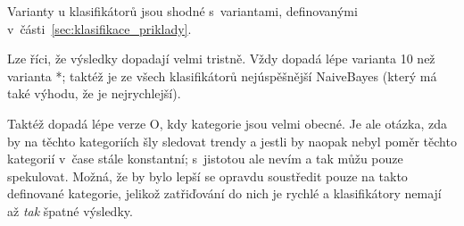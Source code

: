 \documentclass[12pt,a4paper]{report}
\begin{document}

Varianty u klasifikátorů jsou shodné s~variantami, definovanými v~části~\ref{sec:klasifikace_priklady}. 

Lze říci, že výsledky dopadají velmi tristně. Vždy dopadá lépe varianta 10 než varianta *; taktéž je ze všech klasifikátorů nejúspěšnější NaiveBayes (který má také výhodu, že je nejrychlejší).

Taktéž dopadá lépe verze O, kdy kategorie jsou velmi obecné. Je ale otázka, zda by na těchto kategoriích šly sledovat trendy a jestli by naopak nebyl poměr těchto kategorií v~čase stále konstantní; s~jistotou ale nevím a tak můžu pouze spekulovat. Možná, že by bylo lepší se opravdu soustředit pouze na takto definované kategorie, jelikož zatřiďování do nich je rychlé a klasifikátory nemají až \emph{tak} špatné výsledky.
\end{document}
